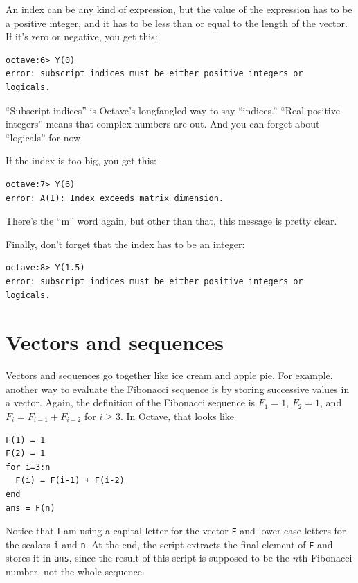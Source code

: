 \documentclass{book}
\begin{document}
An index can be any kind of expression, but the value of the
expression has to be a positive integer, and it has to be
less than or equal to the length of the vector. If it's
zero or negative, you get this:

\begin{verbatim}
octave:6> Y(0)
error: subscript indices must be either positive integers or 
logicals.
\end{verbatim}

``Subscript indices'' is Octave's longfangled way to say ``indices.''
``Real positive integers'' means that complex numbers are
out. And you can forget about ``logicals'' for now.

If the index is too big, you get this:

\begin{verbatim}
octave:7> Y(6)
error: A(I): Index exceeds matrix dimension.
\end{verbatim}

There's the ``m'' word again, but other than that, this message
is pretty clear.

Finally, don't forget that the index has to be an integer:

\begin{verbatim}
octave:8> Y(1.5)
error: subscript indices must be either positive integers or
logicals.
\end{verbatim}


\section{Vectors and sequences}

Vectors and sequences go together like ice cream and apple pie. For
example, another way to evaluate the Fibonacci sequence is by
storing successive values in a vector. Again, the definition of the
Fibonacci sequence is $F_1 = 1$, $F_2 = 1$, and $F_{i} = F_{i-1} +
F_{i-2}$ for $i \ge 3$. In Octave, that looks like

\begin{verbatim}
F(1) = 1
F(2) = 1
for i=3:n
  F(i) = F(i-1) + F(i-2)
end
ans = F(n)
\end{verbatim}

Notice that I am using a capital letter for the vector {\tt F}
and lower-case letters for the scalars {\tt i} and {\tt n}.
At the end, the script extracts the final element of {\tt F} and
stores it in {\tt ans}, since the result of this script is supposed
to be the $n$th Fibonacci number, not the whole sequence.
\end{document}
